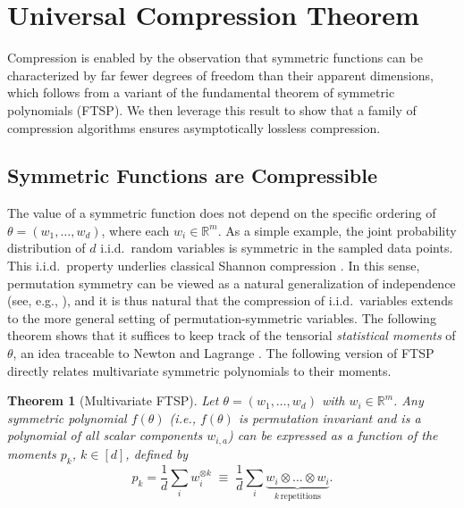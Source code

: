 \documentclass{article}
\theoremstyle{plain}
\newtheorem{theorem}{Theorem}
\begin{document}

\vspace{-2mm}
\section{Universal Compression Theorem}\label{sec: theory}
\vspace{-1mm}


Compression is enabled by the observation that symmetric functions can be characterized by far fewer degrees of freedom than their apparent dimensions, which follows from a variant of the fundamental theorem of symmetric polynomials (FTSP). We then leverage this result to show that a family of compression algorithms ensures asymptotically lossless compression.

\vspace{-2mm}
\subsection{Symmetric Functions are Compressible}%
\vspace{-1mm}

The value of a symmetric function does not depend on the specific ordering of $\theta = (w_1, \dots, w_d)$, where each $w_i \in \mathbb{R}^m$. As a simple example, the joint probability distribution of $d$ i.i.d.\ random variables is symmetric in the sampled data points. This i.i.d.\ property underlies classical Shannon compression \citep{CoverInformationTheory}. In this sense, permutation symmetry can be viewed as a natural generalization of independence (see, e.g., \cite{bloem2020probabilistic}), and it is thus natural that the compression of i.i.d.\ variables extends to the more general setting of permutation-symmetric variables. The following theorem shows that it suffices to keep track of the tensorial \emph{statistical moments} of $\theta$, an idea traceable to Newton and Lagrange \citep{blum2017fundamental}. %
The following version of FTSP directly relates multivariate symmetric polynomials to their moments.


\begin{theorem}[Multivariate FTSP]\label{thm:fundamental_multisym}
    Let $\theta = (w_1, \dots, w_d)$ with $w_i \in \mathbb{R}^m$. Any symmetric polynomial $f(\theta)$ (i.e., $f(\theta)$ is permutation invariant and is a polynomial of all scalar components $w_{i,a}$) can be expressed as a function of the moments $p_k$, $k \in [d]$, defined by
    \begin{equation}
        p_k = \frac{1}{d} \sum_i w_i^{\otimes k} \;\equiv\; \frac{1}{d} \sum_i \underbrace{w_i \otimes \dots \otimes w_i}_{k \,\text{repetitions}}.
    \end{equation}
\end{theorem}
\end{document}
